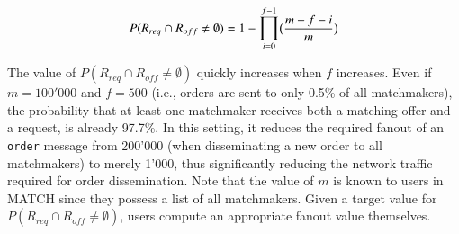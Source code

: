 \begin{equation}
P(R_{req} \cap R_{off} \neq \emptyset) = 1 - \mathlarger{\prod}_{i=0}^{f-1} \big(\frac{m - f - i}{m}\big)
\label{eq:dissemination}
\end{equation}

The value of $ P(R_{req} \cap R_{off} \neq \emptyset) $ quickly increases when $ f $ increases.
Even if $ m = 100'000 $ and $ f = 500 $ (i.e., orders are sent to only 0.5\% of all matchmakers), the probability that at least one matchmaker receives both a matching offer and a request, is already 97.7\%.
In this setting, it reduces the required fanout of an \texttt{order} message from 200'000 (when disseminating a new order to all matchmakers) to merely 1'000, thus significantly reducing the network traffic required for order dissemination.
Note that the value of $ m $ is known to users in MATCH since they possess a list of all matchmakers.
Given a target value for $ P(R_{req} \cap R_{off} \neq \emptyset) $, users compute an appropriate fanout value themselves.


